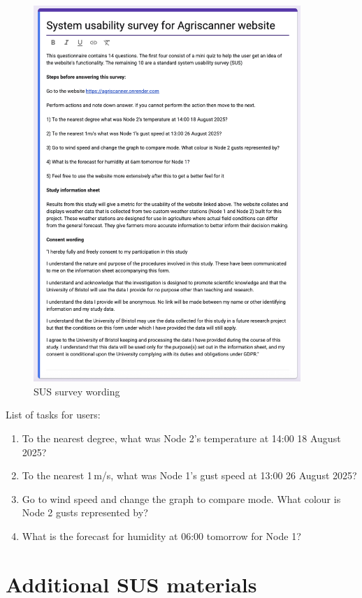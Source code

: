 \begin{figure}[H]
    \centering
    \includegraphics[width=0.9\textwidth]{contents/appendix/fig5/sus_survey.png}
    \caption{SUS survey wording}
    \label{fig:survey-wording}
\end{figure}

List of tasks for users:

\begin{enumerate}\label{list-of-tasks}
  \item To the nearest degree, what was Node 2's temperature at 14:00 18 August
  2025?
  \item To the nearest 1\,m/s, what was Node 1's gust speed at 13:00 26 August
  2025?
  \item Go to wind speed and change the graph to compare mode. What colour is
  Node 2 gusts represented by?
  \item What is the forecast for humidity at 06:00 tomorrow for Node 1?
\end{enumerate}

\section{Additional SUS materials}\label{app:correlation-sus}

